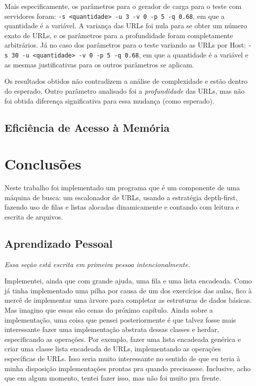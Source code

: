 \documentclass{article}
\def\code#1{\texttt{#1}}
\begin{document}
Mais especificamente, os parâmetros para o gerador de carga para o teste com servidores foram: \code{-s <quantidade> -u 3 -v 0 -p 5 -q 0.68}, em que a quantidade é a variável. A variança das URLs foi nula para se obter um número exato de URLs, e os parâmetros para a profundidade foram completamente arbitrários. Já no caso dos parâmetros para o teste variando as URLs por Host: \code{-s 30 -u <quantidade> -v 0 -p 5 -q 0.68}, em que a quantidade é a variável e as mesmas justificativas para os outros parâmetros se aplicam.

Os resultados obtidos não contradizem a análise de complexidade e estão dentro do esperado. Outro parâmetro analisado foi a \textit{profundidade} das URLs, mas não foi obtida diferença significativa para essa mudança (como esperado).

\subsection{Eficiência de Acesso à Memória}


\section{Conclusões}

Neste trabalho foi implementado um programa que é um componente de uma máquina de busca: um escalonador de URLs, usando a estratégia depth-first, fazendo uso de filas e listas alocadas dinamicamente e contando com leitura e escrita de arquivos.

\subsection{Aprendizado Pessoal}

\textit{Essa seção está escrita em primeira pessoa intencionalmente.}

Implementei, ainda que com grande ajuda, uma fila e uma lista encadeada. Como já tinha implementado uma pilha por causa de um dos exercícios das aulas, fico à mercê de implementar uma àrvore para completar as estruturas de dados básicas. Mas imagino que essas são cenas do próximo capítulo. Ainda sobre a implementação, uma coisa que pensei posteriormente é que talvez fosse mais interessante fazer uma implementação abstrata dessas classes e herdar, especificando as operações. Por exemplo, fazer uma lista encadeada genérica e criar uma classe lista encadeada de URLs, implementando as operações específicas de URLs. Isso seria muito interessante no sentido de que eu teria à minha disposição implementações prontas pra quando precisassse. Inclusive, acho que em algum momento, tentei fazer isso, mas não foi muito pra frente.
\end{document}
